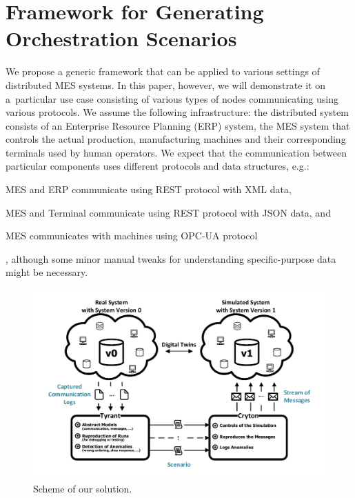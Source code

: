 {\section{Framework for Generating Orchestration Scenarios}
\label{sec:overview}

We propose a generic framework that can be applied to various settings of
distributed MES systems. In this paper, however, we will demonstrate it on
a~particular use case consisting of various types of nodes communicating using
various protocols.
%
We assume the following infrastructure: the distributed system consists of an
Enterprise Resource Planning (ERP) system, the MES system that controls the
actual production, manufacturing machines and their corresponding terminals
used by human operators.  
%
We expect that the communication between particular components uses
different protocols and data structures, e.g.: \begin{inparaenum}[(1)]
%
\item MES and ERP communicate using REST protocol with XML data, 
%
\item MES and Terminal communicate using REST protocol with JSON data, and 
%
\item MES communicates with machines using OPC-UA protocol\end{inparaenum},
    although some minor manual tweaks for understanding specific-purpose data
    might be necessary.

%
\begin{figure}[bt]
  \centering
  \includegraphics[scale=0.8]{figs/eurocast-diagram.pdf}
  \caption{Scheme of our solution.}
  \label{fig:tunis-diagram}
\end{figure}

}
